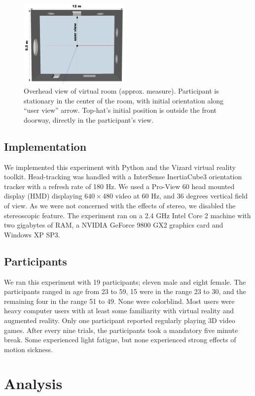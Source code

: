 \documentclass{acmsiggraph}                     %
\begin{document}
\begin{figure}[t]
	\centering
	\includegraphics[width=2.15in]{figures/augmentedroom.png}
	\caption{Overhead view of virtual room (approx. measure).  Participant is stationary in the center of the room, with initial orientation along ``user view'' arrow.  Top-hat's initial position is outside the front doorway, directly in the participant's view.}
\end{figure}

\subsection{Implementation}

We implemented this experiment with Python and the Vizard virtual reality toolkit.  Head-tracking was handled with a InterSense InertiaCube3 orientation tracker with a refresh rate of 180 Hz.  We used a Pro-View 60 head mounted display (HMD) displaying $640\times480$ video at 60 Hz, and 36 degrees vertical field of view.  As we were not concerned with the effects of stereo, we disabled the stereoscopic feature.  The experiment ran on a 2.4 GHz Intel Core 2 machine with two gigabytes of RAM, a NVIDIA GeForce 9800 GX2 graphics card and Windows XP SP3.

\subsection{Participants}

We ran this experiment with 19 participants; eleven male and eight female.  The participants ranged in age from 23 to 59, 15 were in the range 23 to 30, and the remaining four in the range 51 to 49.  None were colorblind.  Most users were heavy computer users with at least some familiarity with virtual reality and augmented reality.  Only one participant reported regularly playing 3D video games.  After every nine trials, the participants took a mandatory five minute break.  Some experienced light fatigue, but none experienced strong effects of motion sickness.

\section{Analysis}
\end{document}
